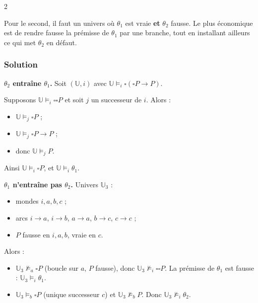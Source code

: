 \documentclass[11pt,a4paper]{article}
\providecommand{\tightlist}{\setlength{\itemsep}{0pt}\setlength{\parskip}{0pt}}
\providecommand{\Box}{\square}
\begin{document}
\begin{indication}{2}

Pour le second, il faut un univers où \(\theta_1\) est vraie \textbf{et} \(\theta_2\) fausse. Le plus économique est de rendre fausse la prémisse de \(\theta_1\) par une branche, tout en installant ailleurs ce qui met \(\theta_2\) en défaut.

\end{indication}

\hypertarget{solution-24}{%
\subsubsection{Solution}\label{solution-24}}

\textbf{\(\theta_2\) entraîne \(\theta_1\).} Soit \((\mathbb U,i)\) avec \(\mathbb U\models_i\Box(\Box P\to P)\).

Supposons \(\mathbb U\models_i\Box\Box P\) et soit \(j\) un successeur de \(i\). Alors :

\begin{itemize}
\tightlist
\item
  \(\mathbb U\models_j\Box P\) ;
\item
  \(\mathbb U\models_j\Box P\to P\) ;
\item
  donc \(\mathbb U\models_j P\).
\end{itemize}

Ainsi \(\mathbb U\models_i\Box P\), et \(\mathbb U\models_i\theta_1\).

\textbf{\(\theta_1\) n'entraîne pas \(\theta_2\).} Univers \(\mathbb U_3\) :

\begin{itemize}
\tightlist
\item
  mondes \(i,a,b,c\) ;
\item
  arcs \(i\to a\), \(i\to b\), \(a\to a\), \(b\to c\), \(c\to c\) ;
\item
  \(P\) fausse en \(i,a,b\), vraie en \(c\).
\end{itemize}

Alors :

\begin{itemize}
\tightlist
\item
  \(\mathbb U_3\not\models_a\Box P\) (boucle sur \(a\), \(P\) fausse), donc \(\mathbb U_3\not\models_i\Box\Box P\). La prémisse de \(\theta_1\) est fausse : \(\mathbb U_3\models_i\theta_1\).
\item
  \(\mathbb U_3\models_b\Box P\) (unique successeur \(c\)) et \(\mathbb U_3\not\models_b P\). Donc \(\mathbb U_3\not\models_i\theta_2\).
\end{itemize}
\end{document}
